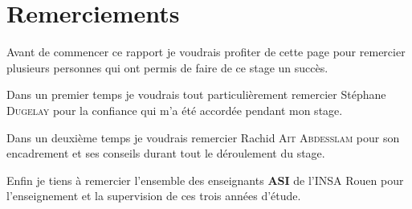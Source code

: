 \chapter*{Remerciements}

\vspace{30mm} 

\begin{center}
Avant de commencer ce rapport je voudrais profiter de cette page pour remercier plusieurs personnes qui ont permis de faire de ce stage un succès.\\
\end{center}
\vspace{5mm}

\begin{center}
Dans un premier temps je voudrais tout particulièrement remercier Stéphane \textsc{Dugelay} pour la confiance qui m'a été accordée pendant mon stage.\\
\end{center}
\vspace{5mm}

\begin{center}
Dans un deuxième temps je voudrais remercier Rachid \textsc{Ait Abdesslam} pour son encadrement et ses conseils durant tout le déroulement du stage.\\

\end{center}
\vspace{5mm}

\begin{center}
Enfin je tiens à remercier l'ensemble des enseignants \textbf{ASI} de l'INSA Rouen pour l'enseignement et la supervision de ces trois années d'étude.\\
\end{center}
\vspace{5mm}